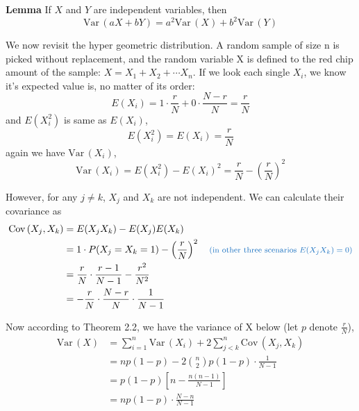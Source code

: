 \documentclass[11pt]{article}
\def\Var{{\textrm{Var}}\,}
\def\Cov{{\textrm{Cov}}\,}
\begin{document}
\begin{tcolorbox}[
	enhanced, 
	width=\textwidth, 
	fontupper=\normalsize,%
	drop fuzzy shadow southwest,
	boxrule=0.4pt,
	sharp corners,
	colframe=yellow!80!black,
	colback=yellow!10]
	
\textbf{\color{RoyalBlue} Lemma} \quad If $X$ and $Y$ are independent variables, then
\[ 
\Var (aX + bY) = a^2 \Var(X) + b^2 \Var(Y)
\]

\end{tcolorbox}

We now revisit the hyper geometric distribution.  A random sample of size n is picked without replacement,  and the random variable X is defined to the red chip amount of the sample: $X = X_1 + X_2 + \cdots X_n$.  If we look each single $X_i$,  we know it's expected value is, no matter of its order:
\[ E(X_i) = 1 \cdot \frac{r}{N} + 0 \cdot \frac{N-r}{N} = \frac{r}{N} \]
and $E(X_i^2)$ is same as $E(X_i)$,
\[ E(X_i^2) = E(X_i) = \frac{r}{N} \]
again we have $\Var (X_i)$,
\[ \Var (X_i) = E(X_i^2)-E(X_i)^2= \frac{r}{N} - \left( \frac{r}{N} \right)^2 \]


However,  for any $j \neq k$, $X_j$ and $X_k$ are not independent.  We can calculate their covariance as
\[
\begin{aligned}
\Cov(X_j, X_k) 
&= E(X_jX_k) - E(X_j)E(X_k) \\
&= 1 \cdot P(X_j=X_k=1) - \left( \frac{r}{N} \right)^2 \quad \text{\color{RoyalBlue} \footnotesize (in other three scenarios $E(X_jX_k)=0$)} \\
&= \frac{r}{N} \cdot \frac{r-1}{N-1} - \frac{r^2}{N^2}   \\
&= - \frac{r}{N} \cdot \frac{N-r}{N} \cdot \frac{1}{N-1} \\
\end{aligned} 
\]

Now according to Theorem 2.2,  we have the variance of X below (let $p$ denote $\displaystyle \frac{r}{N}$),
\[
\begin{aligned}
\Var (X) 
&= \sum _{i=1} ^n \Var (X_i) + 2 \sum _{j<k} ^n \Cov(X_j, X_k) \\
&= np(1-p) - 2 \binom {n}{2} p(1-p) \cdot \frac{1}{N-1} \\
&= p(1-p) \left[ n - \frac{n(n-1)}{N-1} \right] \\
&= np(1-p) \cdot \frac{N-n}{N-1} \\
\end{aligned} 
\]









\clearpage

\printbibliography [title={Reference}]


\end{document}
